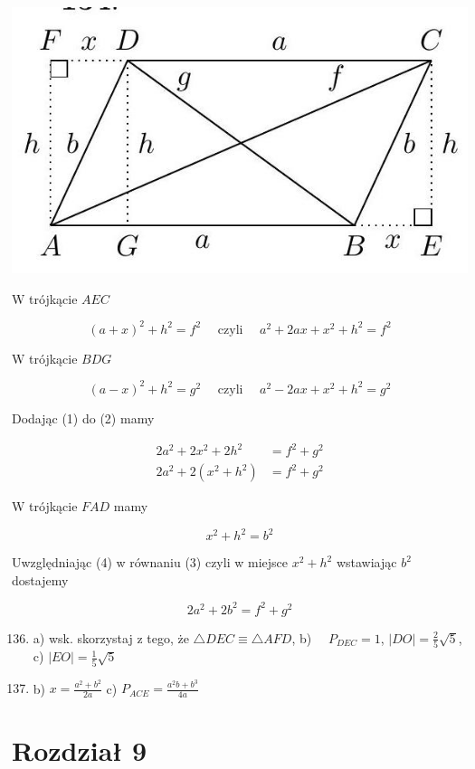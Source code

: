 \documentclass[10pt]{article}
\begin{document}
\begin{center}
\includegraphics[max width=\textwidth]{2024_11_21_71f62bd117d375398909g-149}
\end{center}

W trójkącie \(A E C\)

\[
(a+x)^{2}+h^{2}=f^{2} \quad \text { czyli } \quad a^{2}+2 a x+x^{2}+h^{2}=f^{2}
\]

W trójkącie \(B D G\)

\[
(a-x)^{2}+h^{2}=g^{2} \quad \text { czyli } \quad a^{2}-2 a x+x^{2}+h^{2}=g^{2}
\]

Dodając (1) do (2) mamy

\[
\begin{aligned}
2 a^{2}+2 x^{2}+2 h^{2} & =f^{2}+g^{2} \\
2 a^{2}+2\left(x^{2}+h^{2}\right) & =f^{2}+g^{2}
\end{aligned}
\]

W trójkącie \(F A D\) mamy

\[
x^{2}+h^{2}=b^{2}
\]

Uwzględniając (4) w równaniu (3) czyli w miejsce \(x^{2}+h^{2}\) wstawiając \(b^{2}\) dostajemy

\[
2 a^{2}+2 b^{2}=f^{2}+g^{2}
\]

\begin{enumerate}
  \setcounter{enumi}{135}
  \item a) wsk. skorzystaj z tego, że \(\triangle D E C \equiv \triangle A F D\), b) \(\quad P_{D E C}=1\), \(|D O|=\frac{2}{5} \sqrt{5}\), c) \(|E O|=\frac{1}{5} \sqrt{5}\)
  \item b) \(x=\frac{a^{2}+b^{2}}{2 a}\) c) \(P_{A C E}=\frac{a^{2} b+b^{3}}{4 a}\)
\end{enumerate}

\section*{Rozdział 9}
\end{document}
